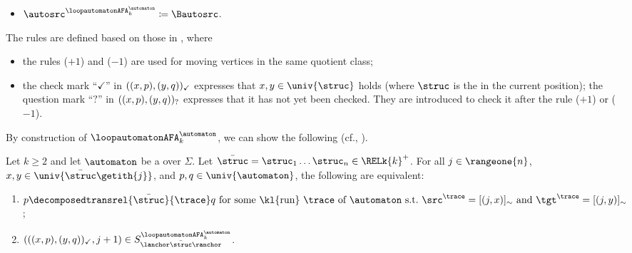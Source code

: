 \documentclass[a4paper,UKenglish,cleveref, autoref, thm-restate]{lipics-v2021}
\DeclarePairedDelimiter\tuple{(}{)}
\newcommand{\defeq}{\coloneq}
\newcommand{\mul}[1]{\bar{#1}}
\newcommand{\vsig}{\Sigma}
\begin{document}
\begin{defi}
\begin{itemize}
\begin{gather*}
            \tuple{\tuple{\tilde{p}, \tilde{q}}_{\checkmark}, \struc} ~\leadsto~ \tuple{\tuple{\tilde{p}, \tilde{q}}_{?}, +1} \tag{$+1$}\\
            \tuple{\tuple{\tilde{p}, \tilde{q}}_{\checkmark}, \struc} ~\leadsto~ \tuple{\tuple{\tilde{p}, \tilde{q}}_{?}, -1} \tag{$-1$}\\
            \tuple{\tuple{\tilde{p}, \tilde{q}}_{?}, \struc} ~\leadsto~
            \tuple{\tuple{\tilde{p}, \tilde{q}}_{\checkmark}, 0} \quad\text{ if $\tilde{p}, \tilde{q} \in \univ{\struc} \times \univ{\automaton}$} \tag{$\checkmark$}
        \end{gather*}
        \item $\autosrc^{\loopautomatonAFA_{k}^{\automaton}} \defeq \Bautosrc$.
    \end{itemize}
\end{defi}
The rules are defined based on those in , where
\begin{itemize}
    \item the rules ($+1$) and ($-1$) are used for moving vertices in the same quotient class;
    \item the check mark ``$\checkmark$'' in $\tuple{\tuple{x, p}, \tuple{y, q}}_{\checkmark}$ expresses that $x, y \in \univ{\struc}$ holds (where $\struc$ is the  in the current position);
    the question mark ``$?$'' in $\tuple{\tuple{x, p}, \tuple{y, q}}_{?}$ expresses that it has not yet been checked.
    They are introduced to check it after the rule ($+1$) or ($-1$).
\end{itemize}
By construction of $\loopautomatonAFA_{k}^{\automaton}$, we can show the following
(cf., \cite[Proposition 5.9]{nakamuraDerivativesGraphsPositive2025}).
\begin{proposition}\label{proposition: decomposition and 2AFA}
    Let $k \ge 2$ and let $\automaton$ be a  over $\vsig$.
    Let $\mul{\struc} = \struc_1 \dots \struc_n \in \RELk{k}^{+}$.
    For all $j \in \rangeone{n}$, $x, y \in \univ{\mul{\struc}\getith{j}}$, and $p, q \in \univ{\automaton}$, the following are equivalent:
    \begin{enumerate}
        \item \label{item: decomposition and 2AFA 1} $p\decomposedtransrel{\mul{\struc}}{\trace} q \mbox{ for some \kl{run} $\trace$ of $\automaton$ s.t.\ $\src^{\trace} = [\tuple{j,x}]_{\sim}$ and $\tgt^{\trace} = [\tuple{j,y}]_{\sim}$}$;
        \item \label{item: decomposition and 2AFA 2} $\tuple{\tuple{\tuple{x, p}, \tuple{y, q}}_{\checkmark}, j+1} \in S^{{\loopautomatonAFA_{k}^{\automaton}}}_{\lanchor \mul{\struc} \ranchor}$.
    \end{enumerate}
\end{proposition}
\end{document}
